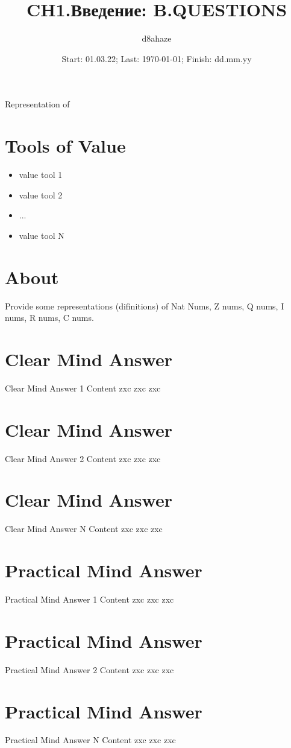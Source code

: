 \documentclass{spaceB}
\author{d8ahaze}
\date{Start: 01.03.22; Last: \today; Finish: dd.mm.yy}
\title{CH1.Введение: B.QUESTIONS} %
\begin{document}
 \maketitle

\bsec Representation of

\section{Tools of Value}

\begin{itemize}
  \item value tool 1
  \item value tool 2
  \item ...
  \item value tool N
\end{itemize}

\section{About} Provide some representations (difinitions) of Nat Nums, Z nums, Q nums, I nums, R nums, C nums.

\section{Clear Mind Answer} Clear Mind Answer 1 Content zxc zxc zxc

\section{Clear Mind Answer} Clear Mind Answer 2 Content zxc zxc zxc

\section{Clear Mind Answer} Clear Mind Answer N Content zxc zxc zxc

\section{Practical Mind Answer} Practical Mind Answer 1 Content zxc zxc zxc

\section{Practical Mind Answer} Practical Mind Answer 2 Content zxc zxc zxc

\section{Practical Mind Answer} Practical Mind Answer N Content zxc zxc zxc
\end{document}
